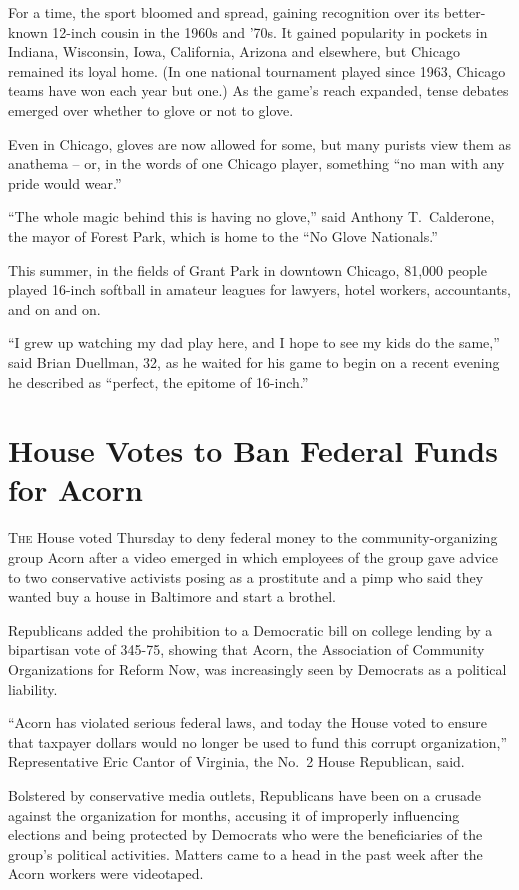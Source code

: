 ﻿\documentclass[12pt]{article}
\begin{document}
For a time, the sport bloomed and spread, gaining recognition over its better-known 12-inch cousin
in the 1960s and '70s. It gained popularity in pockets in Indiana, Wisconsin, Iowa, California,
Arizona and elsewhere, but Chicago remained its loyal home. (In one national tournament played since
1963, Chicago teams have won each year but one.) As the game's reach expanded, tense debates emerged
over whether to glove or not to glove.

Even in Chicago, gloves are now allowed for some, but many purists view them as anathema -- or, in
the words of one Chicago player, something ``no man with any pride would wear.''

``The whole magic behind this is having no glove,'' said Anthony T.~Calderone, the mayor of Forest
Park, which is home to the ``No Glove Nationals.''

This summer, in the fields of Grant Park in downtown Chicago, 81,000 people played 16-inch softball
in amateur leagues for lawyers, hotel workers, accountants, and on and on.

``I grew up watching my dad play here, and I hope to see my kids do the same,'' said Brian Duellman,
32, as he waited for his game to begin on a recent evening he described as ``perfect, the epitome of
16-inch.''

\section{House Votes to Ban Federal Funds for Acorn}

\lettrine{T}{he} House voted Thursday to deny federal money to the community-organizing group
Acorn\cite{acorn} after a video emerged in which employees of the group gave advice to two
conservative activists posing as a prostitute and a pimp who said they wanted buy a house in
Baltimore and start a brothel\cite{brothel}.

Republicans added the prohibition to a Democratic bill on college lending by a bipartisan vote of
345-75, showing that Acorn, the Association of Community Organizations for Reform Now, was
increasingly seen by Democrats as a political liability.

``Acorn has violated serious federal laws, and today the House voted to ensure that taxpayer dollars
would no longer be used to fund this corrupt organization,'' Representative Eric Cantor of Virginia,
the No.~2 House Republican, said.

Bolstered by conservative media outlets, Republicans have been on a crusade against the organization
for months, accusing it of improperly influencing elections and being protected by Democrats who
were the beneficiaries of the group's political activities. Matters came to a head in the past week
after the Acorn workers were videotaped.
\end{document}
